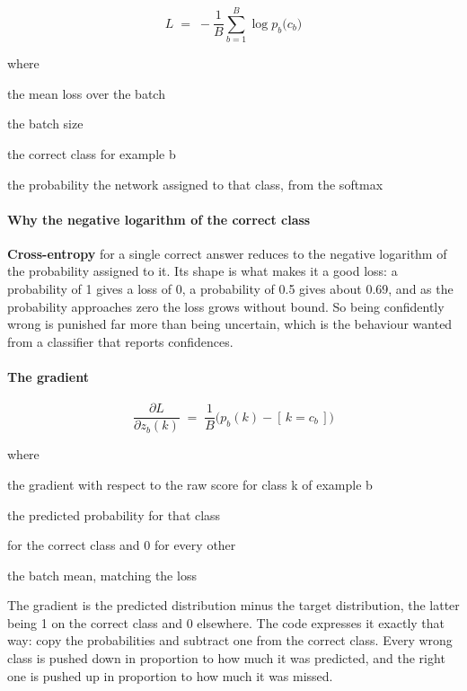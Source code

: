 \begin{equation}
L \;=\; -\frac{1}{B}\sum_{b=1}^{B} \log p_b\big(c_b\big)
\end{equation}

\noindent where
\begin{description}[leftmargin=2.4em,style=nextline,font=\normalfont\ttfamily]\setlength\itemsep{1pt}
  \item[{$L$}] \normalfont the mean loss over the batch
  \item[{$B$}] \normalfont the batch size
  \item[{$c_b$}] \normalfont the correct class for example b
  \item[{$p_b(c_b)$}] \normalfont the probability the network assigned to that class, from the softmax
\end{description}

\paragraph{Why the negative logarithm of the correct class}
\textbf{Cross-entropy} for a single correct answer reduces to the negative logarithm of the probability assigned to it. Its shape is what makes it a good loss: a probability of 1 gives a loss of 0, a probability of 0.5 gives about 0.69, and as the probability approaches zero the loss grows without bound. So being confidently wrong is punished far more than being uncertain, which is the behaviour wanted from a classifier that reports confidences.


\paragraph{The gradient}

\begin{equation}
\frac{\partial L}{\partial z_b(k)} \;=\; \frac{1}{B}\Big( p_b(k) - [\,k = c_b\,] \Big)
\end{equation}

\noindent where
\begin{description}[leftmargin=2.4em,style=nextline,font=\normalfont\ttfamily]\setlength\itemsep{1pt}
  \item[{$\frac{\partial L}{\partial z_b(k)}$}] \normalfont the gradient with respect to the raw score for class k of example b
  \item[{$p_b(k)$}] \normalfont the predicted probability for that class
  \item[{$[\,k = c_b\,]$}]  for the correct class and 0 for every other
  \item[{$\frac{1}{B}$}] \normalfont the batch mean, matching the loss
\end{description}
The gradient is the predicted distribution minus the target distribution, the latter being 1 on the correct class and 0 elsewhere. The code expresses it exactly that way: copy the probabilities and subtract one from the correct class. Every wrong class is pushed down in proportion to how much it was predicted, and the right one is pushed up in proportion to how much it was missed.

